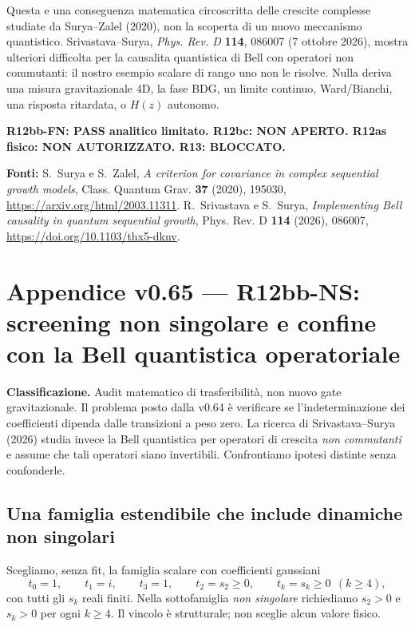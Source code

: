 \documentclass[11pt,a4paper]{article}
\begin{document}
Questa e una conseguenza matematica circoscritta delle crescite complesse studiate da Surya--Zalel (2020), non la scoperta di un nuovo meccanismo quantistico. Srivastava--Surya, \emph{Phys. Rev. D} \textbf{114}, 086007 (7 ottobre 2026), mostra ulteriori difficolta per la causalita quantistica di Bell con operatori non commutanti: il nostro esempio scalare di rango uno non le risolve. Nulla deriva una misura gravitazionale 4D, la fase BDG, un limite continuo, Ward/Bianchi, una risposta ritardata, o $H(z)$ autonomo.

\textbf{R12bb-FN: PASS analitico limitato. R12bc: NON APERTO. R12as fisico: NON AUTORIZZATO. R13: BLOCCATO.}

\textbf{Fonti:} S.~Surya e S.~Zalel, \emph{A criterion for covariance in complex sequential growth models}, Class. Quantum Grav. \textbf{37} (2020), 195030, \url{https://arxiv.org/html/2003.11311}. R.~Srivastava e S.~Surya, \emph{Implementing Bell causality in quantum sequential growth}, Phys. Rev. D \textbf{114} (2026), 086007, \url{https://doi.org/10.1103/thx5-dknv}.




\clearpage
\section*{Appendice v0.65 --- R12bb-NS: screening non singolare e confine con la Bell quantistica operatoriale}
\textbf{Classificazione.} Audit matematico di trasferibilit\`a, non nuovo gate gravitazionale. Il problema posto dalla v0.64 \`e verificare se l'indeterminazione dei coefficienti dipenda dalle transizioni a peso zero. La ricerca di Srivastava--Surya (2026) studia invece la Bell quantistica per operatori di crescita \emph{non commutanti} e assume che tali operatori siano invertibili. Confrontiamo ipotesi distinte senza confonderle.

\subsection*{Una famiglia estendibile che include dinamiche non singolari}
Scegliamo, senza fit, la famiglia scalare con coefficienti gaussiani
\begin{equation}
\boxed{t_0=1,\qquad t_1=i,\qquad t_3=1,\qquad t_2=s_2\geq0,\qquad t_k=s_k\geq0\ \ (k\geq4),}\tag{NS.1}
\end{equation}
con tutti gli $s_k$ reali finiti. Nella sottofamiglia \emph{non singolare} richiediamo $s_2>0$ e $s_k>0$ per ogni $k\ge4$. Il vincolo \`e strutturale; non sceglie alcun valore fisico.
\end{document}

